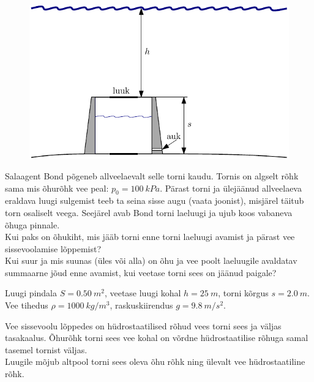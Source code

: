 
\begin{figure}%
\includegraphics[width=\linewidth]{2012-lahg-05-allveelaev_g}%
\end{figure}
Salaagent Bond põgeneb allveelaevalt selle torni kaudu. Tornis on algselt
rõhk sama mis õhurõhk vee peal: $p_0 = \SI{100}{kPa}$. Pärast torni ja ülejäänud
allveelaeva eraldava luugi sulgemist teeb ta seina sisse augu (vaata joonist), misjärel
täitub torn osaliselt veega. Seejärel avab Bond torni laeluugi ja ujub
koos vabaneva õhuga pinnale.\\
\osa Kui paks on õhukiht, mis jääb torni enne torni
laeluugi avamist ja pärast vee sissevoolamise lõppemist?\\
\osa Kui suur ja mis suunas (üles või alla) on õhu ja vee poolt laeluugile avaldatav summaarne jõud enne
avamist, kui veetase torni sees on jäänud paigale?
\par
Luugi pindala $S =
\SI{0,50}{m^2}$, veetase luugi kohal $h=\SI{25}{m}$, torni kõrgus 
$s=\SI{2,0}{m}$. Vee tihedus $\rho = \SI{1000}{kg/m^3}$, raskuskiirendus $g =
\SI{9,8}{m/s^2}$.

\hint
\osa Vee sissevoolu lõppedes on hüdrostaatilised rõhud vees torni sees ja väljas tasakaalus. Õhurõhk torni sees vee kohal on võrdne hüdrostaatilise rõhuga samal tasemel tornist väljas.\\
\osa Luugile mõjub altpool torni sees oleva õhu rõhk ning ülevalt vee hüdrostaatiline rõhk.

